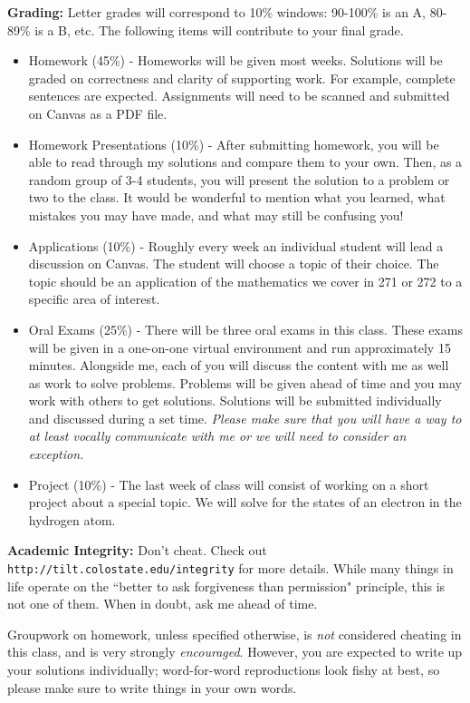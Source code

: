 \documentclass[12pt]{amsbook}
\begin{document}
\textbf{Grading:} Letter grades will correspond to 10\% windows: 90-100\% is an A, 80-89\% is a B, etc. The following items will contribute to your final grade.
\begin{itemize}
\item Homework (45\%) - Homeworks will be given most weeks. Solutions will be graded on correctness and clarity of supporting work. For example, complete sentences are expected. Assignments will need to be scanned and submitted on Canvas as a PDF file.
\item Homework Presentations (10\%) - After submitting homework, you will be able to read through my solutions and compare them to your own. Then, as a random group of 3-4 students, you will present the solution to a problem or two to the class. It would be wonderful to mention what you learned, what mistakes you may have made, and what may still be confusing you!
\item Applications (10\%) - Roughly every week an individual student will lead a discussion on Canvas. The student will choose a topic of their choice. The topic should be an application of the mathematics we cover in 271 or 272 to a specific area of interest.
\item Oral Exams (25\%) - There will be three oral exams in this class. These exams will be given in a one-on-one virtual environment and run approximately 15 minutes.  Alongside me, each of you will discuss the content with me as well as work to solve problems. Problems will be given ahead of time and you may work with others to get solutions.  Solutions will be submitted individually and discussed during a set time. \emph{Please make sure that you will have a way to at least vocally communicate with me or we will need to consider an exception.}
\item Project (10\%) - The last week of class will consist of working on a short project about a special topic.  We will solve for the states of an electron in the hydrogen atom.
\end{itemize}

\textbf{Academic Integrity:} Don't cheat. Check out \texttt{http://tilt.colostate.edu/integrity} for more details. While many things in life operate on the ``better to ask forgiveness than permission" principle, this is not one of them. When in doubt, ask me ahead of time.

Groupwork on homework, unless specified otherwise, is \emph{not} considered cheating in this class, and is very strongly \emph{encouraged}. However, you are expected to write up your solutions individually; word-for-word reproductions look fishy at best, so please make sure to write things in your own words.
\end{document}
